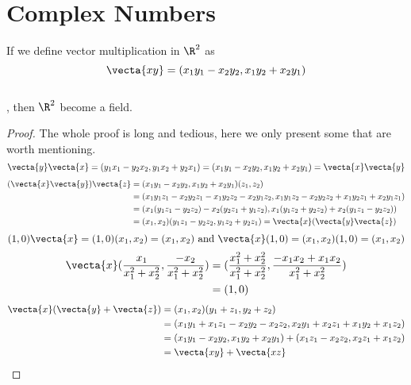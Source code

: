 \documentclass{report}
\begin{document}
\section{Complex Numbers}
\begin{theorem}
\label{1.6.1}
If we define vector multiplication in $\R^2$  as
 \begin{equation}
 \vecta{xy}=(x_1y_1-x_2y_2,x_1y_2+x_2y_1)
\end{equation}\\
, then $\R^2$ become a field.
\end{theorem}
\begin{proof}
The whole proof is long and tedious, here we only present some that are worth mentioning.\\
\begin{equation}
\vecta{y}\vecta{x}=(y_1x_1-y_2x_2,y_1x_2+y_2x_1)=(x_1y_1-x_2y_2,x_1y_2+x_2y_1)=\vecta{x}\vecta{y}
\end{equation}
\begin{align}
  (\vecta{x}\vecta{y})\vecta{z}&=(x_1y_1-x_2y_2,x_1y_2+x_2y_1)(z_1,z_2)\\
  &=(x_1y_1z_1-x_2y_2z_1-x_1y_2z_2-x_2y_1z_2,x_1y_1z_2-x_2y_2z_2+x_1y_2z_1+x_2y_1z_1)\\
  &=(x_1(y_1z_1-y_2z_2)-x_2(y_2z_1+y_1z_2),x_1(y_1z_2+y_2z_2)+x_2(y_1z_1-y_2z_2))\\
  &=(x_1,x_2)(y_1z_1-y_2z_2,y_1z_2+y_2z_1)=\vecta{x}(\vecta{y}\vecta{z})
\end{align}
\begin{equation}
  (1,0)\vecta{x}=(1,0)(x_1,x_2)=(x_1,x_2)\text{ and }\vecta{x}(1,0)=(x_1,x_2)(1,0)=(x_1,x_2)
\end{equation}
\begin{align}
\vecta{x}(\frac{x_1}{x_1^2+x_2^2},\frac{-x_2}{x_1^2+x_2^2})&=(\frac{x_1^2+x_2^2}{x_1^2+x_2^2},\frac{-x_1x_2+x_1x_2}{x_1^2+x_2^2})\\
&=(1,0)
\end{align}
\begin{align}
\vecta{x}(\vecta{y}+\vecta{z})&=(x_1,x_2)(y_1+z_1,y_2+z_2)\\
&=(x_1y_1+x_1z_1-x_2y_2-x_2z_2,x_2y_1+x_2z_1+x_1y_2+x_1z_2)\\
&=(x_1y_1-x_2y_2,x_1y_2+x_2y_1)+(x_1z_1-x_2z_2,x_2z_1+x_1z_2)\\
&=\vecta{xy}+\vecta{xz}
\end{align}
\end{proof}
\end{document}
